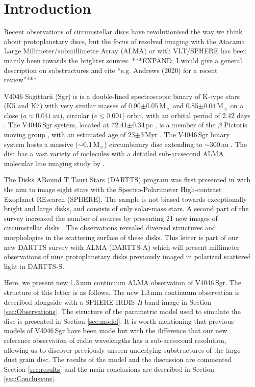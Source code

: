 \documentclass[letters,usenatbib,times]{mnras}
\begin{document}
\section{Introduction} \label{sec:Introduction}

Recent observations of circumstellar discs have revolutionised the way we think about protoplanetary discs, but the focus of resolved imaging with the Atacama Large Millimeter/submillimetre Array (ALMA) or with VLT/SPHERE has been mainly been towards the brighter sources. ***EXPAND, I would give a general description on substructures and cite ``e.g. Andrews (2020) for a recent review''***

V4046 Sagittarii (Sgr) is is a double-lined spectroscopic binary of K-type stars (K5 and K7) with very similar masses of 0.90$\pm$0.05\,M$_{\sun}$ and 0.85$\pm$0.04\,M$_{\sun}$ \citep{Rosenfeld_2012} on a close ($a \approx 0.041$\,au), circular ($e\leq0.001$) orbit, with an orbital period of 2.42 days \citep{refId0}. The V4046\,Sgr system, located at 72.41$\pm$0.34\,pc \citep{Gaia}, is a member of the $\beta$ Pictoris moving group \citep{Zuckerman_2004}, with an estimated age of 23$\pm$3\,Myr \citep{Mamajek_2014}. The V4046\,Sgr binary system hosts a massive ($\sim$0.1\,M$_{\sun}$) circumbinary disc extending to $\sim$300\,au \citep{Rosenfeld_2013, Rodriguez_2010}. The disc has a vast variety of molecules with a detailed sub-arcsecond ALMA molecular line imaging study by \citet{Kastner_2018}. 

The Disks ARound T Tauri Stars (DARTTS) program was first presented in \citet{Avenhaus_2018} with the aim to image eight stars with the Spectro-Polarimeter High-contrast Exoplanet REsearch (SPHERE). The sample is not biased towards exceptionally bright and large disks, and consists of only solar-mass stars. A second part of the survey increased the number of sources by presenting 21 new images of circumstellar disks \citep{Garufi2020}. The observations revealed diversed structures and morphologies in the scattering surface of these disks. This letter is part of our new DARTTS survey with ALMA (DARTTS-A) which will present millimeter observations of nine protoplanetary disks previously imaged in polarized scattered light in DARTTS-S.  

Here, we present new 1.3\,mm continuum ALMA observation of V4046\,Sgr. The structure of this letter is as follows. The new 1.3\,mm continuum observation is described alongside with a SPHERE-IRDIS \textit{H}-band image in Section \ref{sec:Observations}. The structure of the parametric model used to simulate the disc is presented in Section \ref{sec:model}. It is worth mentioning that previous models of V4046\,Sgr have been made \citep{Ru_z_Rodr_guez_2019, Rosenfeld_2013, 2019ApJ...882..160Q} but with the difference that our new reference observation of radio wavelengths has a sub-arcsecond resolution, allowing us to discover previously unseen underlying substructures of the large-dust grain disc. The results of the model and the discussion are commented Section \ref{sec:results} and the main conclusions are described in Section \ref{sec:Conclusions}.
\end{document}
